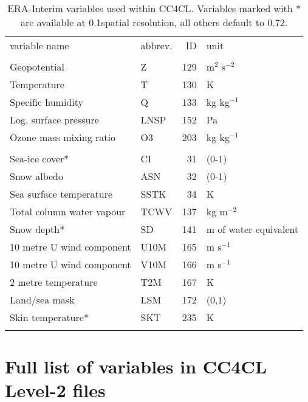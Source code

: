 \begin{table}[ht]
  \caption{ERA-Interim variables used within CC4CL. Variables marked with * are available at 0.1\textdegree spatial resolution, all others default to 0.72\textdegree.}
  \begin{tabular}{p{3.8cm}|l|r|p{1.5cm}}
    \tophline
    variable name & abbrev. & ID & unit \\
    \middlehline
    \multicolumn{4}{c}{profile variables} \\
    \middlehline
    Geopotential & Z & 129 & m$^2$ s$^{-2}$ \\
    Temperature  & T & 130 & K \\
    Specific humidity & Q & 133 & kg kg$^{-1}$ \\
    Log. surface pressure & LNSP & 152 & Pa \\
    Ozone mass mixing ratio & O3 & 203 & kg kg$^{-1}$ \\
    \middlehline
    \multicolumn{4}{c}{surface and single level variables} \\
    \middlehline
    Sea-ice cover* & CI & 31 & (0-1) \\
    Snow albedo & ASN & 32 & (0-1) \\
    Sea surface temperature & SSTK & 34 & K \\
    Total column water vapour & TCWV & 137 & kg m$^{-2}$ \\
    Snow depth* & SD & 141 & m of water equivalent \\
    10 metre U wind component & U10M & 165 & m s$^{-1}$ \\
    10 metre U wind component & V10M & 166 & m s$^{-1}$ \\
    2 metre temperature & T2M & 167 & K \\
    Land/sea mask & LSM & 172 & (0,1) \\
    Skin temperature* & SKT & 235 & K \\
    \bottomhline
  \end{tabular}
  \label{tab:ERA-Interim}
\end{table}

\section{Full list of variables in CC4CL Level-2 files}   

